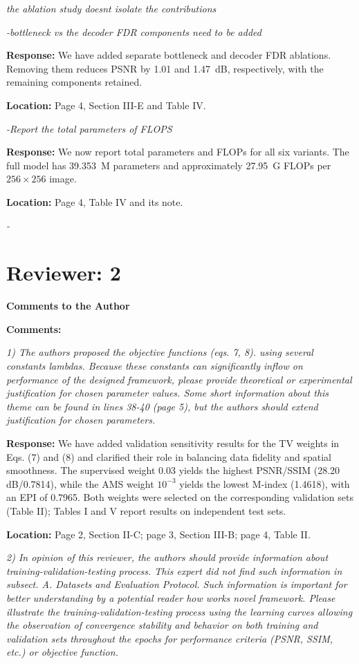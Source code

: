 \documentclass[11pt,letterpaper]{article}
\newcommand{\reviewgroup}[1]{%
  \Needspace{5\baselineskip}%
  \medskip\textit{#1}\par
}
\begin{document}
\reviewgroup{the ablation study doesn\textquotesingle{}t isolate the contributions}

\textit{-bottleneck vs the decoder FDR components need to be added}

\textbf{Response:} We have added separate bottleneck and decoder FDR ablations. Removing them reduces PSNR by 1.01 and 1.47~dB, respectively, with the remaining components retained.

\textbf{Location:} Page 4, Section III-E and Table IV.

\textit{-Report the total parameters of FLOPS}

\textbf{Response:} We now report total parameters and FLOPs for all six variants. The full model has 39.353~M parameters and approximately 27.95~G FLOPs per \(256\times256\) image.

\textbf{Location:} Page 4, Table IV and its note.

\textit{-}

\section*{Reviewer: 2}
\textbf{Comments to the Author}\par
\textbf{Comments:}

\textit{1) The authors proposed the objective functions (eqs. 7, 8). using several constants lambdas. Because these constants can significantly inflow on performance of the designed framework, please provide theoretical or experimental justification for chosen parameter values. Some short information about this theme can be found in lines 38-40 (page 5), but the authors should extend justification for chosen parameters.}

\medskip
\textbf{Response:} We have added validation sensitivity results for the TV weights in Eqs. (7) and (8) and clarified their role in balancing data fidelity and spatial smoothness. The supervised weight 0.03 yields the highest PSNR/SSIM (28.20 dB/0.7814), while the AMS weight \(10^{-3}\) yields the lowest M-index (1.4618), with an EPI of 0.7965. Both weights were selected on the corresponding validation sets (Table II); Tables I and V report results on independent test sets.

\textbf{Location:} Page 2, Section II-C; page 3, Section III-B; page 4, Table II.

\textit{2) In opinion of this reviewer, the authors should provide information about training-validation-testing process. This expert did not find such information in subsect. A. Datasets and Evaluation Protocol. Such information is important for better understanding by a potential reader how works novel framework. Please illustrate the training-validation-testing process using the learning curves allowing the observation of convergence stability and behavior on both training and validation sets throughout the epochs for performance criteria (PSNR, SSIM, etc.) or objective function.}
\end{document}
